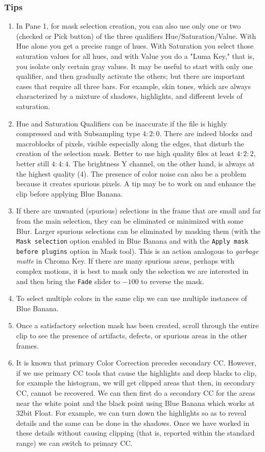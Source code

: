 \subsubsection*{Tips}

\begin{enumerate}
	\item In Pane 1, for mask selection creation, you can also use only one or two (checked or Pick button) of the three qualifiers Hue/Saturation/Value. With Hue alone you get a precise range of hues. With Saturation you select those saturation values for all hues, and with Value you do a "Luma Key," that is, you isolate only certain gray values. It may be useful to start with only one qualifier, and then gradually activate the others; but there are important cases that require all three bars. For example, skin tones, which are always characterized by a mixture of shadows, highlights, and different levels of saturation.
	\item Hue and Saturation Qualifiers can be inaccurate if the file is highly compressed and with Subsampling type $4:2:0$. There are indeed blocks and macroblocks of pixels, visible especially along the edges, that disturb the creation of the selection mask. Better to use high quality files at least $4:2:2$, better still $4:4:4$. The brightness Y channel, on the other hand, is always at the highest quality (4). The presence of color noise can also be a problem because it creates spurious pixels. A tip may be to work on and enhance the clip before applying Blue Banana.
	\item If there are unwanted (spurious) selections in the frame that are small and far from the main selection, they can be eliminated or minimized with some Blur. Larger spurious selections can be eliminated by masking them (with the \texttt{Mask selection} option enabled in Blue Banana and with the \texttt{Apply mask before plugins} option in Mask tool). This is an action analogous to \textit{garbage matte} in Chroma Key. If there are many spurious areas, perhaps with complex motions, it is best to mask only the selection we are interested in and then bring the \texttt{Fade} slider to $-100$ to reverse the mask.
	\item To select multiple colors in the same clip we can use multiple instances of Blue Banana.
	\item Once a satisfactory selection mask has been created, scroll through the entire clip to see the presence of artifacts, defects, or spurious areas in the other frames.
	\item  It is known that primary Color Correction precedes secondary CC. However, if we use primary CC tools that cause the highlights and deep blacks to clip, for example the histogram, we will get clipped areas that then, in secondary CC, cannot be recovered. We can then first do a secondary CC for the areas near the white point and the black point using Blue Banana which works at 32bit Float.  For example, we can turn down the highlights so as to reveal details and the same can be done in the shadows. Once we have worked in these details without causing clipping (that is, reported within the standard range) we can switch to primary CC.
\end{enumerate}

